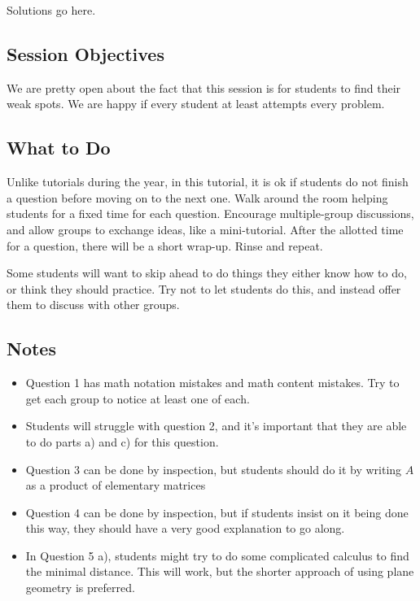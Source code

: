 \documentclass[red]{tutorial}
\theoremstyle{definition}
\theoremstyle{theorem}
\begin{document}
\begin{solutions}
  Solutions go here.
\end{solutions}

\begin{instructions}
  \subsection*{Session Objectives}
  We are pretty open about the fact that this session is 
  for students to find their weak spots. We are happy if 
  every student at least attempts every problem.

  \subsection*{What to Do}
  Unlike tutorials during the year, in this tutorial, it is 
  ok if students do not finish a question before moving on to 
  the next one. Walk around the room helping students for a 
  fixed time for each question. Encourage multiple-group 
  discussions, and allow groups to exchange ideas, like a 
  mini-tutorial. After the allotted time for a question, 
  there will be a short wrap-up. Rinse and repeat.

  Some students will want to skip ahead to do things they 
  either know how to do, or think they should practice. Try not 
  to let students do this, and instead offer them to discuss 
  with other groups.
  \subsection*{Notes}
  \begin{itemize}
    \item Question 1 has math notation mistakes and math content 
      mistakes. Try to get each group to notice at least one of each.
    \item Students will struggle with question 2, and it's 
      important that they are able to do parts a) and c) for this 
      question.
    \item Question 3 can be done by inspection, but students should 
      do it by writing $A$ as a product of elementary matrices
    \item Question 4 can be done by inspection, but if students 
      insist on it being done this way, they should have a very 
      good explanation to go along.
    \item In Question 5 a), students might try to do some complicated 
      calculus to find the minimal distance. This will work, but the 
      shorter approach of using plane geometry is preferred.
  \end{itemize}
\end{instructions}
\end{document}
